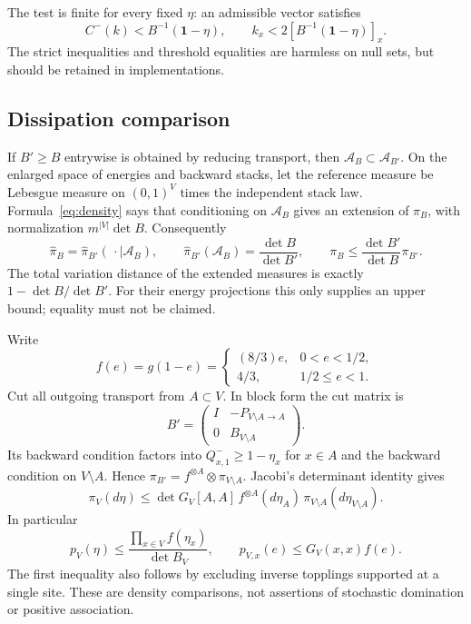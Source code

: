 \documentclass[11pt]{article}
\numberwithin{equation}{section}
\theoremstyle{definition}
\newcommand{\ind}{\mathbf 1}
\begin{document}
The test is finite for every fixed $\eta$: an admissible vector satisfies
\[
 C^-(k)<B^{-1}(\ind-\eta),\qquad
 k_x<2[B^{-1}(\ind-\eta)]_x.
\]
The strict inequalities and threshold equalities are harmless on null sets, but should be retained in implementations.

\subsection{Dissipation comparison}
If $B'\ge B$ entrywise is obtained by reducing transport, then $\mathcal A_B\subset\mathcal A_{B'}$. On the enlarged space of energies and backward stacks, let the reference measure be Lebesgue measure on $(0,1)^V$ times the independent stack law. Formula~\eqref{eq:density} says that conditioning on $\mathcal A_B$ gives an extension of $\pi_B$, with normalization $m^{|V|}\det B$. Consequently
\begin{equation}\label{eq:conditioning}
 \widehat\pi_B=\widehat\pi_{B'}(\,\cdot\mid\mathcal A_B),\qquad
 \widehat\pi_{B'}(\mathcal A_B)=\frac{\det B}{\det B'},\qquad
 \pi_B\le\frac{\det B'}{\det B}\pi_{B'}.
\end{equation}
The total variation distance of the extended measures is exactly $1-\det B/\det B'$. For their energy projections this only supplies an upper bound; equality must not be claimed.

Write
\begin{equation}\label{eq:f}
 f(e)=g(1-e)=\begin{cases}(8/3)e,&0<e<1/2,\\4/3,&1/2\le e<1.\end{cases}
\end{equation}
Cut all outgoing transport from $A\subset V$. In block form the cut matrix is
\[
 B'=\begin{pmatrix}I&-P_{V\setminus A\to A}\\0&B_{V\setminus A}\end{pmatrix}.
\]
Its backward condition factors into $Q^-_{x,1}\ge1-\eta_x$ for $x\in A$ and the backward condition on $V\setminus A$. Hence $\pi_{B'}=f^{\otimes A}\otimes\pi_{V\setminus A}$. Jacobi's determinant identity gives
\begin{equation}\label{eq:local-cut}
 \pi_V(d\eta)\le\det G_V[A,A]\,
 f^{\otimes A}(d\eta_A)\,\pi_{V\setminus A}(d\eta_{V\setminus A}).
\end{equation}
In particular
\begin{equation}\label{eq:global-density-bound}
 p_V(\eta)\le\frac{\prod_{x\in V}f(\eta_x)}{\det B_V},\qquad
 p_{V,x}(e)\le G_V(x,x)f(e).
\end{equation}
The first inequality also follows by excluding inverse topplings supported at a single site. These are density comparisons, not assertions of stochastic domination or positive association.
\end{document}
